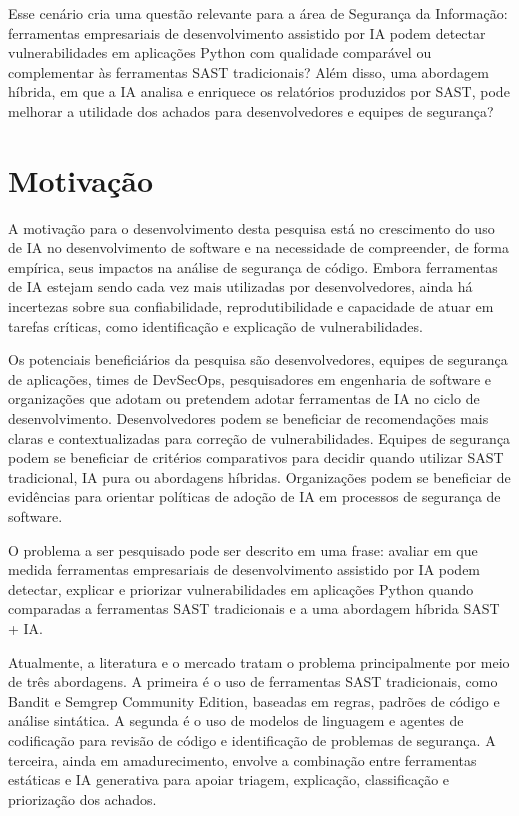 Esse cenário cria uma questão relevante para a área de Segurança da Informação: ferramentas empresariais de desenvolvimento assistido por IA podem detectar vulnerabilidades em aplicações Python com qualidade comparável ou complementar às ferramentas SAST tradicionais? Além disso, uma abordagem híbrida, em que a IA analisa e enriquece os relatórios produzidos por SAST, pode melhorar a utilidade dos achados para desenvolvedores e equipes de segurança?



\section{Motivação}\label{sec:motivacao}


A motivação para o desenvolvimento desta pesquisa está no crescimento do uso de IA no desenvolvimento de software e na necessidade de compreender, de forma empírica, seus impactos na análise de segurança de código. Embora ferramentas de IA estejam sendo cada vez mais utilizadas por desenvolvedores, ainda há incertezas sobre sua confiabilidade, reprodutibilidade e capacidade de atuar em tarefas críticas, como identificação e explicação de vulnerabilidades.

Os potenciais beneficiários da pesquisa são desenvolvedores, equipes de segurança de aplicações, times de DevSecOps, pesquisadores em engenharia de software e organizações que adotam ou pretendem adotar ferramentas de IA no ciclo de desenvolvimento. Desenvolvedores podem se beneficiar de recomendações mais claras e contextualizadas para correção de vulnerabilidades. Equipes de segurança podem se beneficiar de critérios comparativos para decidir quando utilizar SAST tradicional, IA pura ou abordagens híbridas. Organizações podem se beneficiar de evidências para orientar políticas de adoção de IA em processos de segurança de software.

O problema a ser pesquisado pode ser descrito em uma frase: avaliar em que medida ferramentas empresariais de desenvolvimento assistido por IA podem detectar, explicar e priorizar vulnerabilidades em aplicações Python quando comparadas a ferramentas SAST tradicionais e a uma abordagem híbrida SAST + IA.

Atualmente, a literatura e o mercado tratam o problema principalmente por meio de três abordagens. A primeira é o uso de ferramentas SAST tradicionais, como Bandit e Semgrep Community Edition, baseadas em regras, padrões de código e análise sintática. A segunda é o uso de modelos de linguagem e agentes de codificação para revisão de código e identificação de problemas de segurança. A terceira, ainda em amadurecimento, envolve a combinação entre ferramentas estáticas e IA generativa para apoiar triagem, explicação, classificação e priorização dos achados.

